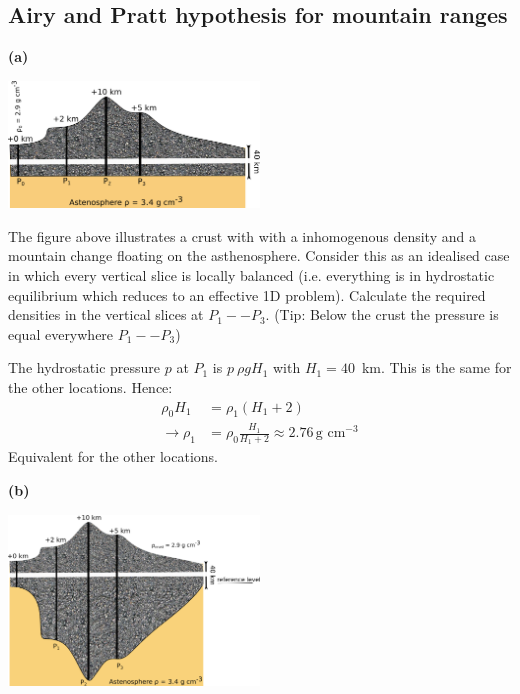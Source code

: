 \subsection{Airy and Pratt hypothesis for mountain ranges}
\textbf{(a)}
\begin{center}
\includegraphics[width=0.5\textwidth]{Figures/Gravimetry/Pratt.png}
\end{center}

The figure above illustrates a crust with  with a inhomogenous density and a mountain change floating on the asthenosphere. Consider this as an idealised case in which every vertical slice is locally balanced (i.e. everything is in hydrostatic equilibrium which reduces to an effective 1D problem). Calculate the required densities in the vertical slices at $P_1 -- P_3$. (Tip: Below the crust the pressure is equal everywhere $P_1 -- P_3$)


\ifanswers
  \begin{tcolorbox}[enhanced jigsaw,breakable,pad at break*=1mm,
    colback=blue!5!white,colframe=babyblueeyes,title=Solutions]
The hydrostatic pressure $p$ at $P_1$ is $p ~ \rho g H_1$ with $H_1=40$~km. This is the same for the other locations. Hence:
\begin{align*}
\rho_0 H_1 &= \rho_1 (H_1 + 2) \\
\rightarrow \rho_1 &= \rho_0 \frac{H_1}{H_1+2} \approx 2.76 \, \text{g cm}^{-3}
\end{align*}
Equivalent for the other locations.
\end{tcolorbox}

\textbf{(b)}

\begin{center}
\includegraphics[width=0.5\textwidth]{Figures/Gravimetry/Airy.png}
\end{center}
\fi

